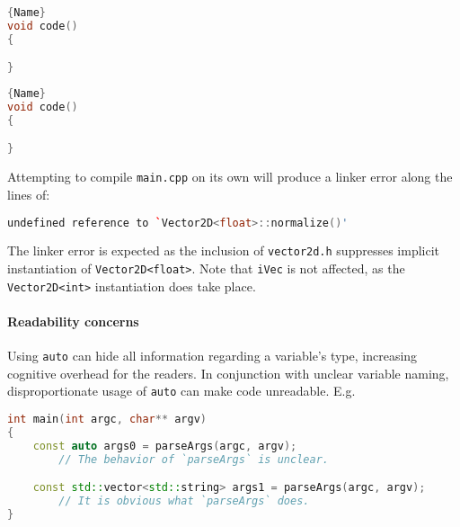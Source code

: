 \documentclass[twoside,10pt,letterpaper,usenames]{newstyle-PearsonGeneric-7-38}
\newcommand{\passthrough}[1]{\texttt{#1}}
\begin{document}
\noindent\begin{minipage}{.45\textwidth}
\begin{lstlisting}[language=C++, caption=code 1,frame=tb]{Name}
void code()
{

}
\end{lstlisting}
\end{minipage}\hfill
\begin{minipage}{.45\textwidth}
\begin{lstlisting}[language=C++, caption=code 2,frame=tb]{Name}
void code()
{

}
\end{lstlisting}
\end{minipage}

Attempting to compile \passthrough{\lstinline!main.cpp!} on its own will
produce a linker error along the lines of:

\begin{lstlisting}[language=C++, caption={missing caption}, label={testlabel}, frame=tb]
undefined reference to `Vector2D<float>::normalize()'
\end{lstlisting}
    

The linker error is expected as the inclusion of
\passthrough{\lstinline!vector2d.h!} suppresses implicit instantiation
of \passthrough{\lstinline!Vector2D<float>!}. Note that
\passthrough{\lstinline!iVec!} is not affected, as the
\passthrough{\lstinline!Vector2D<int>!} instantiation does take place.

\paragraph[Readability concerns]{Readability concerns}\label{readability-concerns}

Using \passthrough{\lstinline!auto!} can hide all information regarding
a variable's type, increasing cognitive overhead for the readers. In
conjunction with unclear variable naming, disproportionate usage of
\passthrough{\lstinline!auto!} can make code unreadable. E.g.

\begin{lstlisting}[language=C++, caption={missing caption}, label={testlabel}, frame=tb]
int main(int argc, char** argv)
{
    const auto args0 = parseArgs(argc, argv);
        // The behavior of `parseArgs` is unclear.

    const std::vector<std::string> args1 = parseArgs(argc, argv);
        // It is obvious what `parseArgs` does.
}
\end{lstlisting}
    
\end{document}
